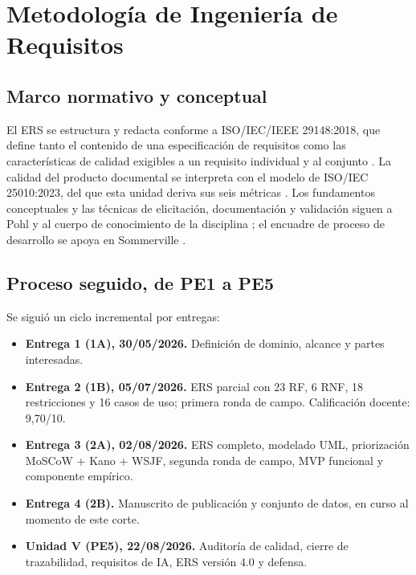 \section{Metodolog\'ia de Ingenier\'ia de Requisitos}

\subsection{Marco normativo y conceptual}

El ERS se estructura y redacta conforme a ISO/IEC/IEEE 29148:2018, que define tanto el contenido de una especificaci\'on de requisitos como las caracter\'isticas de calidad exigibles a un requisito individual y al conjunto \cite{iso29148_2018}. La calidad del producto documental se interpreta con el modelo de ISO/IEC 25010:2023, del que esta unidad deriva sus seis m\'etricas \cite{iso25010_2023}. Los fundamentos conceptuales y las t\'ecnicas de elicitaci\'on, documentaci\'on y validaci\'on siguen a Pohl \cite{pohl2010requirements} y al cuerpo de conocimiento de la disciplina \cite{washizaki2024swebok}; el encuadre de proceso de desarrollo se apoya en Sommerville \cite{sommerville2015software}.

\subsection{Proceso seguido, de PE1 a PE5}

Se sigui\'o un ciclo incremental por entregas:

\begin{itemize}
\item \textbf{Entrega 1 (1A), 30/05/2026.} Definici\'on de dominio, alcance y partes interesadas.
\item \textbf{Entrega 2 (1B), 05/07/2026.} ERS parcial con 23 RF, 6 RNF, 18 restricciones y 16 casos de uso; primera ronda de campo. Calificaci\'on docente: 9,70/10.
\item \textbf{Entrega 3 (2A), 02/08/2026.} ERS completo, modelado UML, priorizaci\'on MoSCoW + Kano + WSJF, segunda ronda de campo, MVP funcional y componente emp\'irico.
\item \textbf{Entrega 4 (2B).} Manuscrito de publicaci\'on y conjunto de datos, en curso al momento de este corte.
\item \textbf{Unidad V (PE5), 22/08/2026.} Auditor\'ia de calidad, cierre de trazabilidad, requisitos de IA, ERS versi\'on 4.0 y defensa.
\end{itemize}

